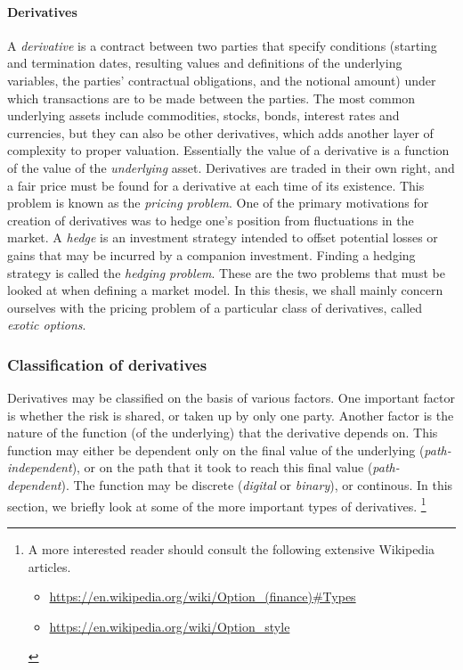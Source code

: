 \paragraph{Derivatives}
A \emph{derivative} is a contract between two parties that specify conditions (starting and termination dates, resulting values and definitions of the underlying variables, the parties' contractual obligations, and the notional amount) under which transactions are to be made between the parties. The most common underlying assets include commodities, stocks, bonds, interest rates and currencies, but they can also be other derivatives, which adds another layer of complexity to proper valuation. Essentially the value of a derivative is a function of the value of the \emph{underlying} asset. Derivatives are traded in their own right, and a fair price must be found for a derivative at each time of its existence. This problem is known as the \emph{pricing problem}. One of the primary motivations for creation of derivatives was to hedge one's position from fluctuations in the market. A \emph{hedge} is an investment strategy intended to offset potential losses or gains that may be incurred by a companion investment. Finding a hedging strategy is called the \emph{hedging problem}. These are the two problems that must be looked at when defining a market model. In this thesis, we shall mainly concern ourselves with the pricing problem of a particular class of derivatives, called \emph{exotic options}.


\subsubsection{Classification of derivatives}
\label{subsubsec:intro-derivative-classification}

Derivatives may be classified on the basis of various factors. One important factor is whether the risk is shared, or taken up by only one party. Another factor is the nature of the function (of the underlying) that the derivative depends on. This function may either be dependent only on the final value of the underlying (\emph{path-independent}), or on the path that it took to reach this final value (\emph{path-dependent}). The function may be discrete (\emph{digital} or \emph{binary}), or continous. In this section, we briefly look at some of the more important types of derivatives. \footnote{
	A more interested reader should consult the following extensive Wikipedia articles.
	\begin{itemize}
		\item \url{https://en.wikipedia.org/wiki/Option_(finance)\#Types}
		\item \url{https://en.wikipedia.org/wiki/Option_style}
	\end{itemize}
}



